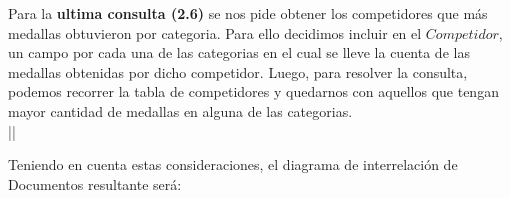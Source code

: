 Para la \textbf{ultima consulta (2.6)} se nos pide obtener los competidores que más 
medallas obtuvieron por categoria. Para ello decidimos incluir en el $Competidor$, un 
campo por cada una de las categorias en el cual se lleve la cuenta de las 
medallas obtenidas por dicho competidor. Luego, para resolver la consulta, 
podemos recorrer la tabla de competidores y quedarnos con aquellos  que 
tengan mayor cantidad de medallas en alguna de las categorias. \\ ||

Teniendo en cuenta estas consideraciones, el diagrama de interrelación de 
Documentos resultante será:\\ \\




 


